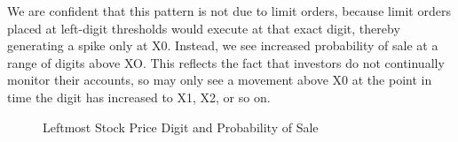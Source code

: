 We are confident that this pattern is not due to limit orders, because limit orders placed at left-digit thresholds would execute at that exact digit, thereby generating a spike only at X0. Instead, we see increased probability of sale at a range of digits above XO. This reflects the fact that investors do not continually monitor their accounts, so may only see a movement above X0 at the point in time the digit has increased to X1, X2, or so on. 

\clearpage

\begin{figure}[hbt!]
	\caption{Leftmost Stock Price Digit and Probability of Sale}%
	\label{fig:left_digit_sell}%
	\centering%
	\bigskip
\end{figure}

